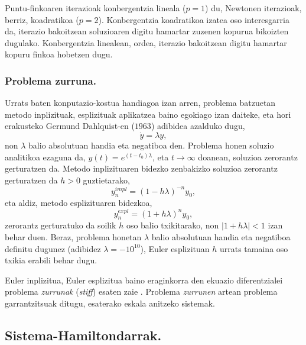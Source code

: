 Puntu-finkoaren iterazioak konbergentzia lineala ($p=1$) du, Newtonen iterazioak, berriz, koadratikoa ($p=2$). Konbergentzia koadratikoa izatea oso interesgarria da, iterazio bakoitzean soluzioaren digitu hamartar zuzenen kopurua bikoizten dugulako. Konbergentzia linealean, ordea, iterazio bakoitzean digitu hamartar kopuru finkoa hobetzen dugu. 
  
\subsubsection*{Problema zurruna.}

Urrats baten konputazio-kostua handiagoa izan arren, problema batzuetan metodo inplizituak, esplizituak aplikatzea baino egokiago izan daiteke, eta hori erakusteko Germund Dahlquist-en ($1963$) adibidea azalduko dugu,
\begin{equation}
 \label{eq:202c}
\dot y=\lambda y,
\end{equation} 
non $\lambda$ balio absolutuan handia eta negatiboa den. Problema honen soluzio analitikoa ezaguna da, $y(t)=e^{(t-t_0)\lambda}$, eta $t \rightarrow \infty$ doanean, soluzioa zerorantz gerturatzen da. Metodo inplizituaren bidezko zenbakizko soluzioa zerorantz gerturatzen da $h>0$ guztietarako,
\begin{equation*}
y_n^{impl}=(1-h\lambda)^{-n} y_0,
\end{equation*}    
eta aldiz, metodo esplizituaren bidezkoa,
\begin{equation*}
y_n^{expl}=(1+h\lambda)^{n} y_0,
\end{equation*}    
zerorantz gerturatuko da soilik $h$ oso balio txikitarako, non $|1+h\lambda|<1$ izan behar duen. Beraz, problema honetan $\lambda$ balio absolutuan handia  eta negatiboa definitu dugunez (adibidez $\lambda=-10^{10}$), Euler esplizituan $h$ urrats tamaina oso txikia erabili behar dugu.    

Euler inplizitua, Euler esplizitua baino eraginkorra den ekuazio diferentzialei problema \emph{zurrunak} (\emph{stiff}) esaten zaie \cite{Hairer2006}. Problema \emph{zurrunen} artean problema garrantzitsuak ditugu, esaterako eskala anitzeko sistemak. 

 

\subsection{Sistema-Hamiltondarrak.}


